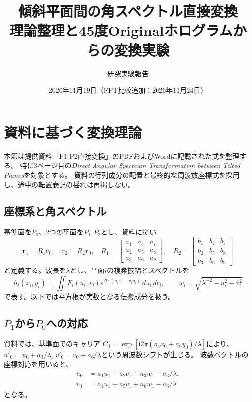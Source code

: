 \documentclass[a4paper,10pt]{ltjsarticle}
\title{傾斜平面間の角スペクトル直接変換\\理論整理と45度Originalホログラムからの変換実験}
\author{研究実験報告}
\date{2026年11月19日（FFT比較追加：2026年11月24日）}
\begin{document}
\maketitle\small
\section{資料に基づく変換理論}
本節は提供資料「P1-P2直接変換」のPDFおよびWordに記載された式を整理する。
特に3ページ目の\textit{Direct Angular Spectrum Transformation between Tilted Planes}を対象とする。
資料の行列成分の配置と最終的な周波数座標式を採用し、途中の転置表記の揺れは再掲しない。

\subsection{座標系と角スペクトル}
基準面を$P_0$、2つの平面を$P_1,P_2$とし、資料に従い
\begin{equation}
 \boldsymbol r_1=R_1\boldsymbol r_0,\quad
 \boldsymbol r_2=R_2\boldsymbol r_0,\quad
 R_1=\begin{bmatrix}a_1&a_4&a_7\\a_2&a_5&a_8\\a_3&a_6&a_9\end{bmatrix},\quad
 R_2=\begin{bmatrix}b_1&b_4&b_7\\b_2&b_5&b_8\\b_3&b_6&b_9\end{bmatrix}
\end{equation}
と定義する。波長を$\lambda$とし、平面$i$の複素振幅とスペクトルを
\begin{equation}
 h_i(x_i,y_i)=\iint F_i(u_i,v_i)e^{\mathrm i2\pi(u_ix_i+v_iy_i)}\,du_i\,dv_i,
 \qquad w_i=\sqrt{\lambda^{-2}-u_i^2-v_i^2}
\end{equation}
で表す。以下では平方根が実数となる伝搬成分を扱う。

\subsection{$P_1$から$P_0$への対応}
資料では、基準面でのキャリア
$C_0=\exp[\mathrm i2\pi(a_3x_0+a_6y_0)/\lambda]$により、
$u'_0=u_0+a_3/\lambda$, $v'_0=v_0+a_6/\lambda$という周波数シフトが生じる。
波数ベクトルの座標対応を用いると、
\begin{align}
 u_0&=a_1u_1+a_2v_1+a_3w_1-a_3/\lambda,\\
 v_0&=a_4u_1+a_5v_1+a_6w_1-a_6/\lambda
\end{align}
となる。
\end{document}
